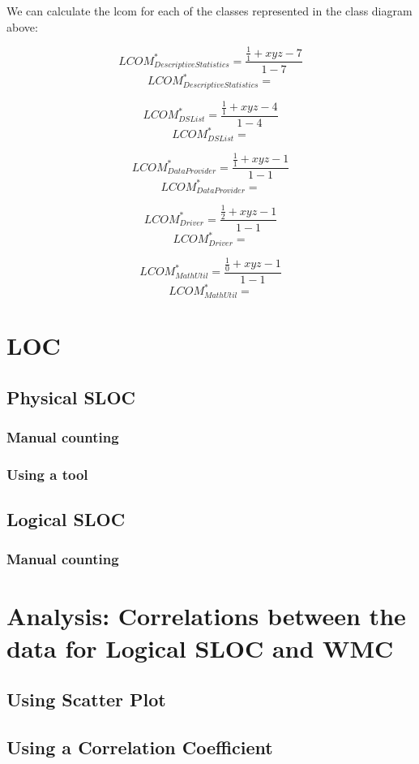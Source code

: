 \documentclass[11pt]{article}
\begin{document}
We can calculate the \gls{lcom} for each of the classes represented in the class diagram above:

$$ LCOM^{*}_{Descriptive Statistics} = \frac{\frac{1}{1}+xyz-7}{1-7} $$
$$ LCOM^{*}_{Descriptive Statistics} =  $$

$$ LCOM^{*}_{DS List} = \frac{\frac{1}{1}+xyz-4}{1-4} $$
$$ LCOM^{*}_{DS List} =  $$

$$ LCOM^{*}_{Data Provider} = \frac{\frac{1}{1}+xyz-1}{1-1} $$
$$ LCOM^{*}_{Data Provider} =  $$

$$ LCOM^{*}_{Driver} = \frac{\frac{1}{2}+xyz-1}{1-1} $$
$$ LCOM^{*}_{Driver} =  $$

$$ LCOM^{*}_{Math Util} = \frac{\frac{1}{0}+xyz-1}{1-1} $$
$$ LCOM^{*}_{Math Util} =  $$

\newpage

\section{LOC}

\subsection{Physical SLOC}

\subsubsection{Manual counting}

\subsubsection{Using a tool}

\subsection{Logical SLOC}

\subsubsection{Manual counting}

\newpage

\section{Analysis: Correlations between the data for Logical SLOC and WMC}

\subsection{Using Scatter Plot}

\subsection{Using a Correlation Coefficient}

\newpage

\printglossaries

\newpage



\end{document}
